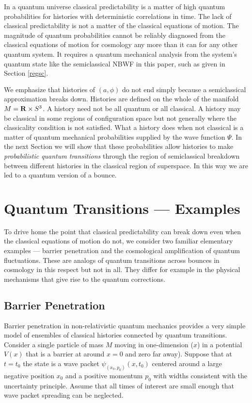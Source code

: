 \documentclass[prd,floats,superscriptaddress,eqsecnum,floatfix,nofootinbib,12pt]{revtex4}
\def\zf{}
\def\mf{}
\def\tf{}
\def\uf{}
\begin{document}
{{{In a quantum universe classical predictability is a matter of high quantum probabilities for histories with deterministic correlations in time. The lack of classical predictability is {\mf not a matter of the classical equations of motion}.  The magnitude of quantum probabilities cannot be reliably diagnosed  from the classical equations of motion  for cosmology any more than it can for any other quantum system. It requires a quantum mechanical analysis from the system's quantum state like the semiclassical NBWF in this paper, such as given in Section \ref{regsc}. 

We emphasize that histories of $(a,\phi)$ do not end simply because a semiclassical approximation breaks down. Histories are defined on the whole of the manifold $M={\bf R} \times S^3$. A history need not be all quantum or all classical. A history may be classical in some regions of configuration space but not generally where the classicality condition is not satisfied. What a history does when not classical is a matter of quantum mechanical probabilities supplied by the wave function $\Psi$. {\zf In the next Section we will show that these probabilities allow histories to make {\it probabilistic quantum transitions} through the region of semiclassical breakdown between different histories in the classical region of superspace. In this way we are led to a quantum version of a bounce. }


\section{Quantum Transitions --- Examples}
\label{qtransitions}

{\tf To drive home the point that classical predictability can break down even when the classical equations of motion do not,  we consider two familiar elementary examples --- barrier penetration and the cosmological amplification of quantum fluctuations. These are analogs of quantum transitions across bounces in cosmology in this respect but not in all. They differ {\uf for example} in the physical mechanisms that give rise to the quantum corrections.}

\subsection{Barrier Penetration}
\label{barrpen}


Barrier penetration in non-relativistic quantum mechanics provides a very simple model of ensembles of classical histories connected by quantum transitions. Consider a single particle of mass $M$ moving in one-dimension ($x$)  in a potential $V(x)$ that is a barrier at around $x=0$ and zero far away). Suppose that at $t=t_0$ the state is a wave packet $\psi_{(x_0,p_0)}(x, t_0)$  centered around a large negative position $x_0$ and a positive momentum $p_0$ with widths consistent with the uncertainty principle. Assume that all times of interest are small enough that wave packet spreading can be neglected.

}}}
\end{document}
